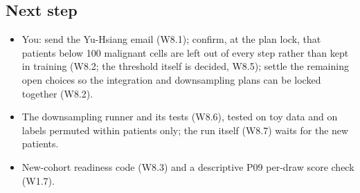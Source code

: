 \subsection*{Next step}
\begin{itemize}
\item You: send the Yu-Hsiang email (W8.1); confirm, at the plan lock, that patients below 100 malignant cells are left out of every step rather than kept in training (W8.2; the threshold itself is decided, W8.5); settle the remaining open choices so the integration and downsampling plans can be locked together (W8.2).
\item The downsampling runner and its tests (W8.6), tested on toy data and on labels permuted within patients only; the run itself (W8.7) waits for the new patients.
\item New-cohort readiness code (W8.3) and a descriptive P09 per-draw score check (W1.7).
\end{itemize}

